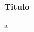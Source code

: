\documentclass[10pt, compress]{beamer}
\begin{document}


\begin{frame}[fragile]
\frametitle{Titulo}
a

\end{frame}
\end{document}
